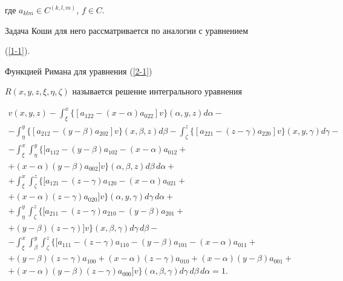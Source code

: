 где $a_{klm}\in C^{(k,l,m)}$, $f\in C$.


Задача Коши для него рассматривается по аналогии с уравнением


(\ref{1-1}).





Функцией Римана для уравнения (\ref{2-1})


$R(x,y,z,\xi,\eta,\zeta)$ называется решение интегрального уравнения


\begin{multline}\label{2-2}     %


v(x,y,z)-\int_{\xi}^{x}\{[a_{122}-(x-\alpha)a_{022}]v\}(\alpha,y,z)d\alpha -\\


%


-\int_{\eta}^{y}\{[a_{212}-(y-\beta)a_{202}]v\}(x,\beta,z)d\beta


-\int_{\zeta}^{z}\{[a_{221}-(z-\gamma)a_{220}]v\}(x,y,\gamma)d\gamma -\\


%


-\int_{\xi}^{x}\int_{\eta}^{y}\{[a_{112}-(y-\beta)a_{102}


-(x-\alpha)a_{012}+\\


%


+(x-\alpha)(y-\beta)a_{002}]v\}(\alpha,\beta,z)d\beta\, d\alpha+\\


%


+\int_{\xi}^{x}\int_{\zeta}^{z}\{[a_{121}-(z-\gamma)a_{120}


-(x-\alpha)a_{021}+\\


%


+(x-\alpha)(z-\gamma)a_{020}]v\}(\alpha,y,\gamma)d\gamma\, d\alpha +\\


%


+\int_{\eta}^{y}\int_{\zeta}^{z}\{[a_{211}-(z-\gamma)a_{210}


-(y-\beta)a_{201}+\\


%


+(y-\beta)(z-\gamma)]v\}(x,\beta,\gamma)d\gamma\, d\beta -\\


%


-\int_{\xi}^{x}\int_{\beta}^{y}\int_{\zeta}^{z}


\{[a_{111}-(z-\gamma)a_{110}-(y-\beta)a_{101}-(x-\alpha)a_{011}+\\


%


+(y-\beta)(z-\gamma)a_{100}+(x-\alpha)(z-\gamma)a_{010}+


(x-\alpha)(y-\beta)a_{001}+ \\


%


+(x-\alpha)(y-\beta)(z-\gamma)a_{000}]v\}(\alpha,\beta,\gamma)


d\gamma\, d\beta\, d\alpha =1.


\end{multline}


